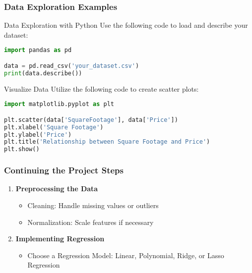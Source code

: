 \documentclass[aspectratio=169]{beamer}
\begin{document}
\begin{frame}[fragile]
    \frametitle{Data Exploration Examples}
    \begin{block}{Data Exploration with Python}
        Use the following code to load and describe your dataset:
        \begin{lstlisting}[language=Python]
import pandas as pd

data = pd.read_csv('your_dataset.csv')
print(data.describe())
        \end{lstlisting}
    \end{block}
    
    \begin{block}{Visualize Data}
        Utilize the following code to create scatter plots:
        \begin{lstlisting}[language=Python]
import matplotlib.pyplot as plt

plt.scatter(data['SquareFootage'], data['Price'])
plt.xlabel('Square Footage')
plt.ylabel('Price')
plt.title('Relationship between Square Footage and Price')
plt.show()
        \end{lstlisting}
    \end{block}
\end{frame}

\begin{frame}
    \frametitle{Continuing the Project Steps}
    \begin{enumerate}[resume]
        \item \textbf{Preprocessing the Data}
            \begin{itemize}
                \item Cleaning: Handle missing values or outliers
                \item Normalization: Scale features if necessary
            \end{itemize}

        \item \textbf{Implementing Regression}
            \begin{itemize}
                \item Choose a Regression Model: Linear, Polynomial, Ridge, or Lasso Regression
            \end{itemize}
    \end{enumerate}
\end{frame}
\end{document}

